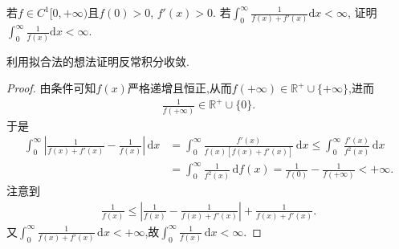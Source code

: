 \documentclass[../../main.tex]{subfiles}%
\begin{document}
\begin{example}
若$f \in C^1[0, +\infty)$且$f(0) > 0$, $f'(x) > 0$. 若$\int_0^{\infty} \frac{1}{f(x) + f'(x)} \mathrm{d}x < \infty$, 证明$\int_0^{\infty} \frac{1}{f(x)} \mathrm{d}x < \infty$.
\end{example}
\begin{note}
利用拟合法的想法证明反常积分收敛.
\end{note}
\begin{proof}

由条件可知$f(x)$严格递增且恒正,从而$f(+\infty) \in \mathbb{R}^+ \cup \{+\infty\}$,进而
\begin{align*}
\frac{1}{f(+\infty)} \in \mathbb{R}^+ \cup \{0\}.
\end{align*}
于是
\begin{align*}
\int_0^{\infty} \left| \frac{1}{f(x) + f'(x)} - \frac{1}{f(x)} \right| \, \mathrm{d}x &= \int_0^{\infty} \frac{f'(x)}{f(x) \left[ f(x) + f'(x) \right]} \, \mathrm{d}x \leqslant \int_0^{\infty} \frac{f'(x)}{f^2(x)} \, \mathrm{d}x \\
&= \int_0^{\infty} \frac{1}{f^2(x)} \, \mathrm{d}f(x) = \frac{1}{f(0)} - \frac{1}{f(+\infty)} < +\infty.
\end{align*}
注意到
\begin{align*}
\frac{1}{f(x)} \leqslant \left| \frac{1}{f(x)} - \frac{1}{f(x) + f'(x)} \right| + \frac{1}{f(x) + f'(x)}.
\end{align*}
又$\int_0^{\infty} \frac{1}{f(x) + f'(x)} \, \mathrm{d}x < +\infty$,故$\int_0^{\infty} \frac{1}{f(x)} \, \mathrm{d}x < \infty$.

\end{proof}
\end{document}
